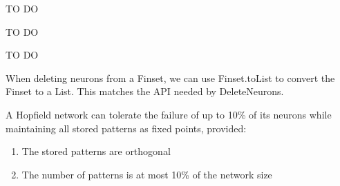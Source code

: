 \begin{lemma}\label{net_input_at_non_deleted_neuron}
\notready
TO DO
\end{lemma}

\begin{lemma}\label{product_net_input_activation_at_non_deleted_neuron}
\notready
TO DO
\end{lemma}

\begin{definition}\label{non_deleted_neuron_maintains_sign_of_activation}
\notready
TO DO
\end{definition}

\begin{definition}\label{DeleteNeurons_with_Finset}
When deleting neurons from a Finset, we can use Finset.toList to convert the Finset to a List.
This matches the API needed by DeleteNeurons.
\end{definition}

\begin{definition}\label{fault_tolerance_bound}
\leanok
A Hopfield network can tolerate the failure of up to 10\% of its neurons
    while maintaining all stored patterns as fixed points, provided:
\begin{enumerate}
\item The stored patterns are orthogonal
\item The number of patterns is at most 10\% of the network size
\end{enumerate}
\end{definition}
